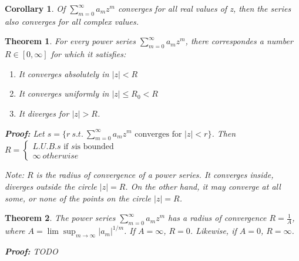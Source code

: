 \documentclass{article}
\newtheorem{theorem}{Theorem}[section]
\newtheorem{corollary}{Corollary}
\theoremstyle{definition}
\begin{document}
\begin{corollary}
Of $\sum_{m=0}^\infty a_m z^m$ converges for all real values of z, then the series also converges for all complex values.	\end{corollary}
\begin{theorem}
For every power series $\sum_{m=0}^\infty a_m z^m$, there correspondes a number $R \in [0, \infty]$ for which it satisfies:
\begin{enumerate}
	\item It converges absolutely in $|z| < R$
	\item It converges uniformly in $|z|\leq R_0 < R$ 
	\item It diverges for $|z|>R$.
\end{enumerate}

\textbf{Proof:} Let $s = \{r\ s.t.\ \sum_{m=0}^\infty a_m z^m\text{ converges for } |z|<r\}$. Then $R = \begin{cases}
L.U.B. s \text{ if } s \text{is bounded} \\ 
\infty \ otherwise
\end{cases}$

Note: $R$ is the radius of convergence of a power series. It converges inside, diverges outside the circle $|z| = R$. On the other hand, it may converge at all some, or none of the points on the circle $|z|=R$. 

\end{theorem}

\begin{theorem}
The power series $\sum_{m=0}^\infty a_m z^m$ has a radius of convergence $R = \frac{1}{A}$, where $A =\lim\sup_{m \to \infty } |a_m|^{1/m}$. If $A = \infty$, $R = 0$. Likewise, if $A=0$, $R = \infty$. 

\textbf{Proof:}
TODO
\end{theorem}
\end{document}
